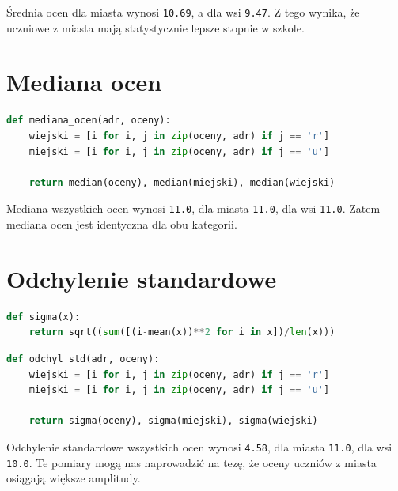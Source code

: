 \documentclass{article}
\begin{document}
\begin{flushleft}
Średnia ocen dla miasta wynosi \texttt{10.69}, a dla wsi \texttt{9.47}. Z tego wynika, że uczniowe z miasta mają statystycznie lepsze stopnie w szkole.
\end{flushleft}
\vspace{3cm}

\section{Mediana ocen}
\begin{lstlisting}[language=Python]
def mediana_ocen(adr, oceny):
    wiejski = [i for i, j in zip(oceny, adr) if j == 'r']
    miejski = [i for i, j in zip(oceny, adr) if j == 'u']
    
    return median(oceny), median(miejski), median(wiejski)
\end{lstlisting}

\begin{flushleft}
Mediana wszystkich ocen wynosi \texttt{11.0}, dla miasta \texttt{11.0}, dla wsi \texttt{11.0}. Zatem mediana ocen jest identyczna dla obu kategorii.
\end{flushleft}

\section{Odchylenie standardowe}
\begin{lstlisting}[language=Python]
def sigma(x):
    return sqrt((sum([(i-mean(x))**2 for i in x])/len(x)))
\end{lstlisting}
\begin{lstlisting}[language=Python]
def odchyl_std(adr, oceny):
    wiejski = [i for i, j in zip(oceny, adr) if j == 'r']
    miejski = [i for i, j in zip(oceny, adr) if j == 'u']
    
    return sigma(oceny), sigma(miejski), sigma(wiejski)
\end{lstlisting}

\begin{flushleft}
Odchylenie standardowe wszystkich ocen wynosi \texttt{4.58}, dla miasta \texttt{11.0}, dla wsi \texttt{10.0}. Te pomiary mogą nas naprowadzić na tezę, że oceny uczniów z miasta osiągają większe amplitudy.
\end{flushleft}
\end{document}
